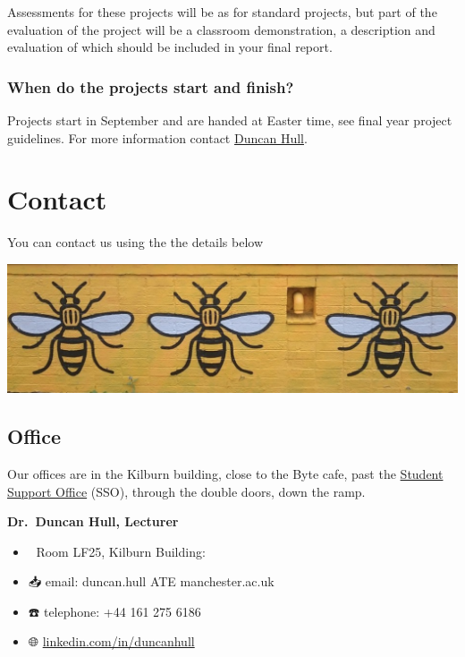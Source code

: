 \documentclass[12pt,]{book}
\providecommand{\tightlist}{%
  \setlength{\itemsep}{0pt}\setlength{\parskip}{0pt}}
\begin{document}
Assessments for these projects will be as for standard projects, but part of the evaluation of the project will be a classroom demonstration, a description and evaluation of which should be included in your final report.

\hypertarget{when-do-the-projects-start-and-finish}{%
\subsection{When do the projects start and finish?}\label{when-do-the-projects-start-and-finish}}

Projects start in September and are handed at Easter time, see final year project guidelines. For more information contact \protect\hyperlink{contact}{Duncan Hull}.

\hypertarget{contact}{%
\chapter{Contact}\label{contact}}

You can contact us using the the details below

\begin{center}\includegraphics[width=1\linewidth]{images/beescape} \end{center}

\hypertarget{office}{%
\section{Office}\label{office}}

Our offices are in the Kilburn building, close to the Byte cafe, past the \href{https://studentnet.cs.manchester.ac.uk/student-services/}{Student Support Office} (SSO), through the double doors, down the ramp.

\textbf{Dr.~Duncan Hull, Lecturer} 👨‍💻

\begin{itemize}
\tightlist
\item
  🏢 Room LF25, Kilburn Building:
\item
  📥 email: duncan.hull ATE manchester.ac.uk
\item
  ☎️ telephone: +44 161 275 6186
\item
  🌐 \href{https://uk.linkedin.com/in/duncanhull}{linkedin.com/in/duncanhull}
\end{itemize}
\end{document}
